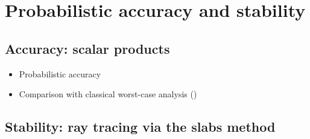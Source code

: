 \documentclass[10pt,conference]{IEEEtran}
\begin{document}
\section{Probabilistic accuracy and stability}

\subsection{Accuracy: scalar products}

\begin{itemize}
\item Probabilistic accuracy
\item Comparison with classical worst-case analysis (\cite[3.1]{higham2002accuracy})
\end{itemize}

\subsection{Stability: ray tracing via the slabs method}



\end{document}
